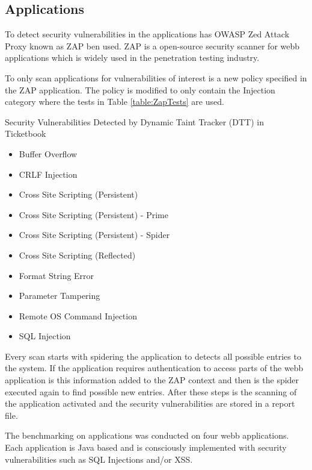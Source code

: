 \subsection{Applications}
To detect security vulnerabilities in the applications has OWASP Zed Attack Proxy \parencite{zap} known as ZAP ben used. ZAP is a open-source security scanner for webb applications which is widely used in the penetration testing industry.

To only scan applications for vulnerabilities of interest is a new policy specified in the ZAP application. The policy is modified to only contain the Injection category where the tests in Table \ref{table:ZapTests} are used.

\begin{table}[!hbt]
  \centering
  \caption{Security Vulnerabilities Detected by Dynamic Taint Tracker (DTT) in Ticketbook}
	\label{table:ZapTests}
	\begin{itemize}
		\item Buffer Overflow
		\item CRLF Injection
		\item Cross Site Scripting (Persistent)
		\item Cross Site Scripting (Persistent) - Prime
		\item Cross Site Scripting (Persistent) - Spider
		\item Cross Site Scripting (Reflected)
		\item Format String Error
		\item Parameter Tampering
		\item Remote OS Command Injection
		\item SQL Injection
	\end{itemize}
\end{table}

Every scan starts with spidering the application to detects all possible entries to the system. If the application requires authentication to access parts of the webb application is this information added to the ZAP context and then is the spider executed again to find possible new entries. After these steps is the scanning of the application activated and the security vulnerabilities are stored in a report file. 

The benchmarking on applications was conducted on four webb applications. Each application is Java based and is consciously implemented with security vulnerabilities such as SQL Injections and/or XSS. 



